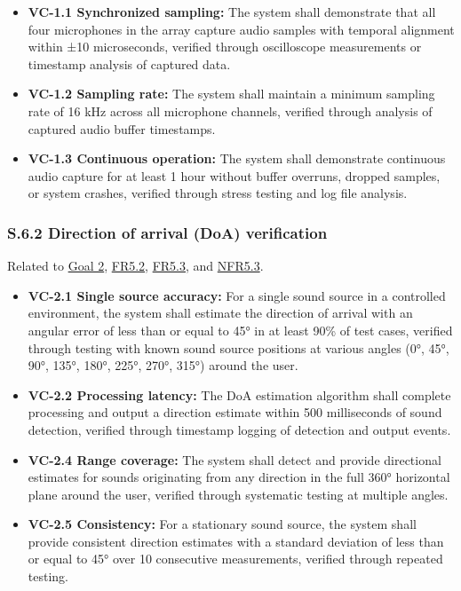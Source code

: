 \documentclass[12pt]{article}
\theoremstyle{definition}
\begin{document}
\begin{itemize}
\item \textbf{VC-1.1 Synchronized sampling:} The system shall demonstrate that
all four microphones in the array capture audio samples with temporal alignment
within ±10 microseconds, verified through oscilloscope measurements or timestamp
analysis of captured data.

\item \textbf{VC-1.2 Sampling rate:} The system shall maintain a minimum
sampling rate of 16 kHz across all microphone channels, verified through
analysis of captured audio buffer timestamps.

\item \textbf{VC-1.3 Continuous operation:} The system shall demonstrate
continuous audio capture for at least 1 hour without buffer overruns, dropped
samples, or system crashes, verified through stress testing and log file
analysis.
\end{itemize}

\subsubsection{S.6.2 Direction of arrival (DoA) verification}

Related to \hyperref[goal:audio_direction_analysis]{Goal 2},
\hyperref[FR5_2]{FR5.2}, \hyperref[FR5_3]{FR5.3}, and \hyperref[NFR5_3]{NFR5.3}.

\begin{itemize}
\item \textbf{VC-2.1 Single source accuracy:} For a single sound source in a
controlled environment, the system shall estimate the direction of arrival with
an angular error of less than or equal to 45° in at least 90\% of test cases,
verified through testing with known sound source positions at various angles
(0°, 45°, 90°, 135°, 180°, 225°, 270°, 315°) around the user.

\item \textbf{VC-2.2 Processing latency:} The DoA estimation algorithm shall
complete processing and output a direction estimate within 500 milliseconds of
sound detection, verified through timestamp logging of detection and output
events.

\item \textbf{VC-2.4 Range coverage:} The system shall detect and provide
directional estimates for sounds originating from any direction in the full 360°
horizontal plane around the user, verified through systematic testing at
multiple angles.

\item \textbf{VC-2.5 Consistency:} For a stationary sound source, the system
shall provide consistent direction estimates with a standard deviation of less
than or equal to 45° over 10 consecutive measurements, verified through repeated
testing.
\end{itemize}
\end{document}
